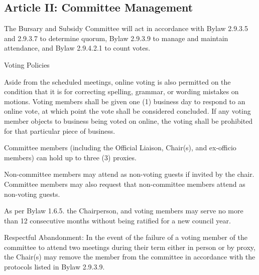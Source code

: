 \subsection{Article II: Committee Management}
\begin{longenum}[ label*=\thesubsection.\arabic*., align=left] 
	\item The Bursary and Subsidy Committee will act in accordance with Bylaw 2.9.3.5 and 2.9.3.7 to determine quorum, Bylaw 2.9.3.9 to manage and maintain attendance, and Bylaw 2.9.4.2.1 to count votes.
	\item Voting Policies
		\begin{longenum}[ label*=\arabic*., align=left] 
		\item Aside from the scheduled meetings, online voting is also permitted on the condition that it is for correcting spelling, grammar, or wording mistakes on motions. Voting members shall be given one (1) business day to respond to an online vote, at which point the vote shall be considered concluded. If any voting member objects to business being voted on online, the voting shall be prohibited for that particular piece of business.
		\item Committee members (including the Official Liaison, Chair(s), and ex-officio members) can hold up to three (3) proxies.
		\end{longenum}
	\item Non-committee members may attend as non-voting guests if invited by the chair. Committee members may also request that non-committee members attend as non-voting guests.
	\item As per Bylaw 1.6.5. the Chairperson, and voting members may serve no more than 12 consecutive months without being ratified for a new council year.
	\item Respectful Abandonment: In the event of the failure of a voting member of the committee to attend two meetings during their term either in person or by proxy, the Chair(s) may remove the member from the committee in accordance with the protocols listed in Bylaw 2.9.3.9.
\end{longenum}

